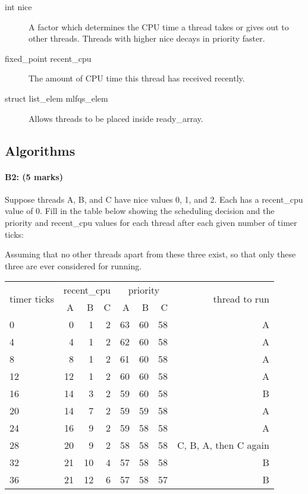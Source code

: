 \begin{description}
  \begin{description}

  \item[int nice] A factor which determines the CPU time a thread takes or gives
    out to other threads. Threads with higher nice decays in priority faster.

  \item[fixed\_point recent\_cpu] The amount of CPU time this thread has received
    recently.

  \item[struct list\_elem mlfqs\_elem] Allows threads to be placed inside
    ready\_array.

  \end{description}

\end{description}

\subsection{Algorithms}
\paragraph{B2: (5 marks)}
Suppose threads A, B, and C have nice values 0, 1, and 2.  Each has a
recent\_cpu value of 0.  Fill in the table below showing the scheduling decision
and the priority and recent\_cpu values for each thread after each given number
of timer ticks:

Assuming that no other threads apart from these three exist, so that only these
three are ever considered for running.

\begin{tabular}{ | l | r r r | r r r | r | }
  \hline
  \multirow{2}{*}{timer ticks} & \multicolumn{3}{|c|}{recent\_cpu} &
    \multicolumn{3}{|c|}{priority} & \multirow{2}{*}{thread to run} \\
     & A  & B & C & A  & B  & C  &   \\
  \hline
  0  & 0  & 1  & 2 & 63 & 60 & 58 & A                     \\
  4  & 4  & 1  & 2 & 62 & 60 & 58 & A                     \\
  8  & 8  & 1  & 2 & 61 & 60 & 58 & A                     \\
  12 & 12 & 1  & 2 & 60 & 60 & 58 & A \and B              \\
  16 & 14 & 3  & 2 & 59 & 60 & 58 & B                     \\
  20 & 14 & 7  & 2 & 59 & 59 & 58 & A \and B              \\
  24 & 16 & 9  & 2 & 59 & 58 & 58 & A                     \\
  28 & 20 & 9  & 2 & 58 & 58 & 58 & C, B, A, then C again \\
  32 & 21 & 10 & 4 & 57 & 58 & 58 & B \and C              \\
  36 & 21 & 12 & 6 & 57 & 58 & 57 & B                     \\
  \hline
\end{tabular}


